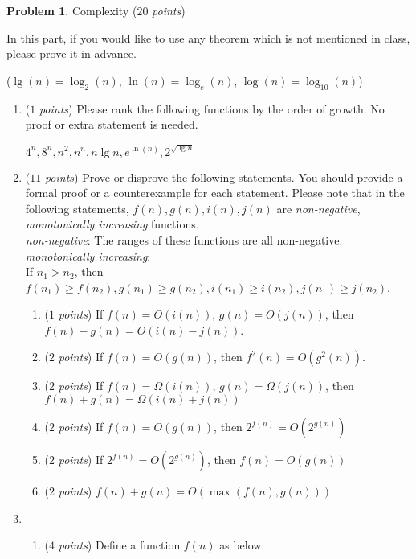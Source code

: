 \documentclass[12pt,a4paper]{report}
\newcommand{\points}[1]{ ($#1$ \textit{points}) }
\theoremstyle{definition}
\newtheorem{problem}{\textbf{Problem}}
\theoremstyle{definition}
\begin{document}
\begin{problem}Complexity\points{20}

In this part, if you would like to use any theorem which is not mentioned in class, please prove it in advance.
\begin{center}
($\lg(n) = \log_2(n)$, $\ln(n) = \log_e(n)$, $\log(n) = \log_{10}(n)$)
\end{center}

\begin{enumerate}[label=\arabic*.]
\item \points{1}Please rank the following functions by the order of growth. No proof or extra statement is needed.
    \begin{center}$4^n, 8^n, n^2, n^n, n\lg n, e^{\ln(n)}, 2^{\sqrt{\lg n}}$\end{center}
\item \points{11}Prove or disprove the following statements. You should provide a formal proof or a counterexample for each statement. Please note that in the following statements, $f(n), g(n), i(n), j(n)$ are \textit{non-negative}, \textit{monotonically increasing} functions.\\
\textit{non-negative}: The ranges of these functions are all non-negative.\\
\textit{monotonically increasing}:\\ If $n_1>n_2$, then $f(n_1)\geq f(n_2), g(n_1)\geq g(n_2), i(n_1)\geq i(n_2), j(n_1)\geq j(n_2)$.
    \begin{enumerate}[label=\alph*.]
    \item \points{1}If $f(n) = O(i(n))$, $g(n) = O(j(n))$, then $f(n) - g(n) = O(i(n) - j(n))$.
    \item \points{2}If $f(n) = O(g(n))$, then $f^2(n) = O(g^2(n))$.
    \item \points{2}If $f(n) = \Omega(i(n))$, $g(n) = \Omega(j(n))$, then $f(n) + g(n) = \Omega(i(n) + j(n))$
    \item \points{2}If $f(n) = O(g(n))$, then $2^{f(n)} = O(2^{g(n)})$
    \item \points{2}If $2^{f(n)} = O(2^{g(n)})$, then $f(n) = O(g(n))$
    \item \points{2}$f(n) + g(n) = \Theta(\max(f(n), g(n)))$
    \end{enumerate}
    \item 
    \begin{enumerate}[label=\alph*.]
        \item \points{4}Define a function $f(n)$ as below:
        \begin{equation*}

\end{equation*}
\end{enumerate}
\end{enumerate}
\end{problem}
\end{document}
